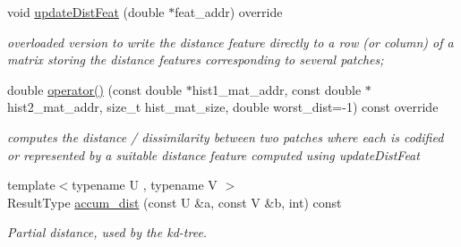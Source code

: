 \begin{DoxyCompactItemize}
\item 
\hypertarget{classKLD_a94e8aa66cbdc98e8a5fb60b133f8aa06}{void \hyperlink{classKLD_a94e8aa66cbdc98e8a5fb60b133f8aa06}{update\-Dist\-Feat} (double $\ast$feat\-\_\-addr) override}\label{classKLD_a94e8aa66cbdc98e8a5fb60b133f8aa06}

\begin{DoxyCompactList}\small\item\em overloaded version to write the distance feature directly to a row (or column) of a matrix storing the distance features corresponding to several patches; \end{DoxyCompactList}\item 
\hypertarget{classKLD_a076a33497b5a2762acc6a8eb166e7d19}{double \hyperlink{classKLD_a076a33497b5a2762acc6a8eb166e7d19}{operator()} (const double $\ast$hist1\-\_\-mat\-\_\-addr, const double $\ast$hist2\-\_\-mat\-\_\-addr, size\-\_\-t hist\-\_\-mat\-\_\-size, double worst\-\_\-dist=-\/1) const override}\label{classKLD_a076a33497b5a2762acc6a8eb166e7d19}

\begin{DoxyCompactList}\small\item\em computes the distance / dissimilarity between two patches where each is codified or represented by a suitable distance feature computed using update\-Dist\-Feat \end{DoxyCompactList}\item 
\hypertarget{classKLD_a9e6f1ce4066dc64e573185fe4ba0398d}{{\footnotesize template$<$typename U , typename V $>$ }\\Result\-Type \hyperlink{classKLD_a9e6f1ce4066dc64e573185fe4ba0398d}{accum\-\_\-dist} (const U \&a, const V \&b, int) const }\label{classKLD_a9e6f1ce4066dc64e573185fe4ba0398d}

\begin{DoxyCompactList}\small\item\em Partial distance, used by the kd-\/tree. \end{DoxyCompactList}\end{DoxyCompactItemize}
